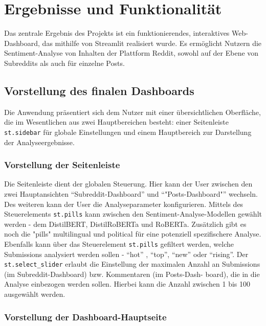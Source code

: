 \section{Ergebnisse und Funktionalität}

Das zentrale Ergebnis des Projekts ist ein funktionierendes, interaktives Web-Dashboard, das mithilfe von Streamlit realisiert wurde. Es ermöglicht Nutzern die Sentiment-Analyse von Inhalten der Plattform Reddit, sowohl auf der Ebene von Subreddits als auch für einzelne Posts.

\subsection{Vorstellung des finalen Dashboards}

Die Anwendung präsentiert sich dem Nutzer mit einer übersichtlichen Oberfläche, die im Wesentlichen aus zwei Hauptbereichen besteht: einer Seitenleiste \verb|st.sidebar| für globale Einstellungen und einem Hauptbereich zur Darstellung der Analyseergebnisse.

\subsubsection{Vorstellung der Seitenleiste}

Die Seitenleiste dient der globalen Steuerung. Hier kann der User zwischen den zwei Hauptansichten \enquote{Subreddit-Dashboard} und \enquote{"Posts-Dashboard"} wechseln. Des weiteren kann der User die Analyseparameter konfigurieren. Mittels des Steuerelements \newline
\verb|st.pills| kann zwischen den Sentiment-Analyse-Modellen gewählt werden - dem DistilBERT, DistilRoBERTa und RoBERTa. Zusätzlich gibt es noch die "pills" multilingual und political für eine potenziell spezifischere Analyse.
Ebenfalls kann über das Steuerelement \verb|st.pills| gefiltert werden, welche Submissions analysiert werden sollen - \enquote{hot} , \enquote{top}, \enquote{new} oder \enquote{rising}. Der \verb|st.select_slider| erlaubt die Einstellung der maximalen Anzahl an Submissions (im Subreddit-Dashboard) bzw. Kommentaren 
(im Posts-Dash-
\newline
board), die in die Analyse einbezogen werden sollen. Hierbei kann die Anzahl zwischen 1 bis 100 ausgewählt werden.

\subsubsection{Vorstellung der Dashboard-Hauptseite}

